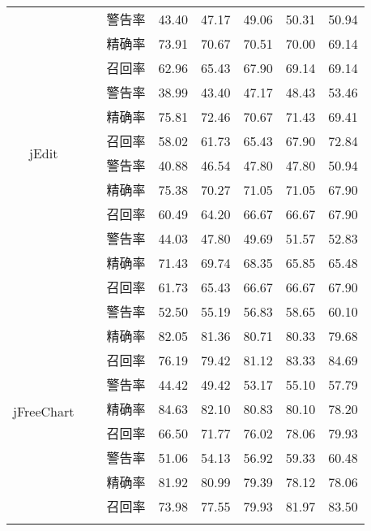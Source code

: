 \begin{table}
\begin{tabular}{cccccccc}
 \hline
\multirow{12}{*}{jEdit     }
&~\multirow{3}{*}{全部属性(\%)}
&     警告率       & 43.40 & 47.17 & 49.06 & 50.31 & 50.94 \\
 &   & 精确率       & 73.91 & 70.67 & 70.51 & 70.00 & 69.14 \\
&             & 召回率       & 62.96 & 65.43 & 67.90 & 69.14 & 69.14 \\
\cline{2-8}
&~\multirow{3}{*}{无代码属性 (\%)}
&   警告率       & 38.99 & 43.40 & 47.17 & 48.43 & 53.46 \\
&  & 精确率       & 75.81 & 72.46 & 70.67 & 71.43 & 69.41 \\
&             & 召回率       & 58.02 & 61.73 & 65.43 & 67.90 & 72.84 \\
\cline{2-8}
&~\multirow{3}{*}{无上下文属性   (\%)}
&    警告率       & 40.88 & 46.54 & 47.80 & 47.80 & 50.94 \\
&  & 精确率       & 75.38 & 70.27 & 71.05 & 71.05 & 67.90 \\
&   & 召回率       & 60.49 & 64.20 & 66.67 & 66.67 & 67.90 \\
\cline{2-8}
&~\multirow{3}{*}{无演化属性(\%)}
&   警告率       & 44.03 & 47.80 & 49.69 & 51.57 & 52.83 \\
 &  & 精确率       & 71.43 & 69.74 & 68.35 & 65.85 & 65.48 \\
&             & 召回率       & 61.73 & 65.43 & 66.67 & 66.67 & 67.90 \\
 \hline
\multirow{12}{*}{jFreeChart  }
&~\multirow{3}{*}{全部属性(\%)}
&    警告率       & 52.50 & 55.19 & 56.83 & 58.65 & 60.10 \\
 &   & 精确率       & 82.05 & 81.36 & 80.71 & 80.33 & 79.68 \\
&             & 召回率       & 76.19 & 79.42 & 81.12 & 83.33 & 84.69 \\
 \cline{2-8}
&~\multirow{3}{*}{无代码属性(\%)}
&   警告率       & 44.42 & 49.42 & 53.17 & 55.10 & 57.79 \\
 &       & 精确率       & 84.63 & 82.10 & 80.83 & 80.10 & 78.20 \\
&             & 召回率       & 66.50 & 71.77 & 76.02 & 78.06 & 79.93 \\
 \cline{2-8}
 &~\multirow{3}{*}{无上下文属性(\%)}         
 &   警告率       & 51.06 & 54.13 & 56.92 & 59.33 & 60.48 \\
&    & 精确率       & 81.92 & 80.99 & 79.39 & 78.12 & 78.06 \\
 &             & 召回率       & 73.98 & 77.55 & 79.93 & 81.97 & 83.50 \\
 \cline{2-8}

\end{tabular}
\end{table}
